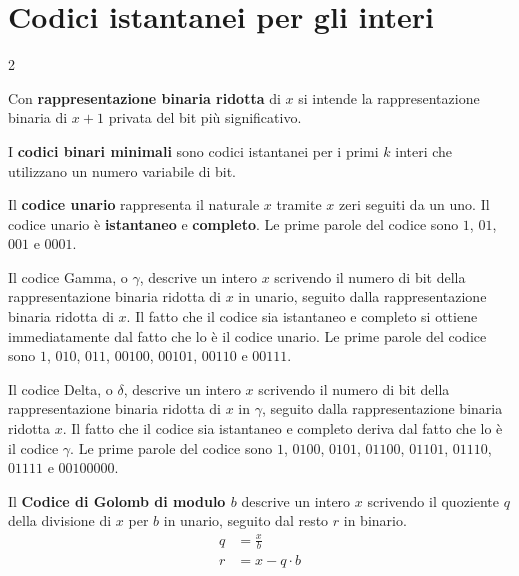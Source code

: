 \documentclass[\main/main.tex]{subfiles}
\begin{document}
\section{Codici istantanei per gli interi}
\begin{multicols}{2}
\begin{definition}
    Con \textbf{rappresentazione binaria ridotta} di \(x\) si intende la rappresentazione binaria di \(x+1\) privata del bit più significativo.
\end{definition}
\begin{definition}
    I \textbf{codici binari minimali} sono codici istantanei per i primi \(k\) interi che utilizzano un numero variabile di bit.
\end{definition}
\begin{definition}
    Il \textbf{codice unario} rappresenta il naturale \(x\) tramite \(x\) zeri seguiti da un uno. Il codice unario è \textbf{istantaneo} e \textbf{completo}. Le prime parole del codice sono \(1\), \(01\), \(001\) e \(0001\).
\end{definition}
\begin{definition}
    Il codice Gamma, o \(\gamma\), descrive un intero \(x\) scrivendo il numero di bit della rappresentazione binaria ridotta di \(x\) in unario, seguito dalla rappresentazione binaria ridotta di \(x\). Il fatto che il codice sia istantaneo e completo si ottiene immediatamente dal fatto che lo è il codice unario. Le prime parole del codice sono \(1\), \(010\), \(011\), \(00100\), \(00101\), \(00110\) e \(00111\).
\end{definition}
\begin{definition}
    Il codice Delta, o \(\delta\), descrive un intero \(x\) scrivendo il numero di bit della rappresentazione binaria ridotta di \(x\) in \(\gamma\), seguito dalla rappresentazione binaria ridotta \(x\). Il fatto che il codice sia istantaneo e completo deriva dal fatto che lo è il codice \(\gamma\). Le prime parole del codice sono \(1\), \(0100\), \(0101\), \(01100\), \(01101\), \(01110\), \(01111\) e \(00100000\).
\end{definition}
\begin{definition}
    Il \textbf{Codice di Golomb di modulo \(b\)} descrive un intero \(x\) scrivendo il quoziente \(q\) della divisione di \(x\) per \(b\) in unario, seguito dal resto \(r\) in binario.
    \[
    \begin{aligned} q &=\frac{x}{b} \\ r &=x-q \cdot b \end{aligned}
\]
\end{definition}
\end{multicols}
\end{document}
